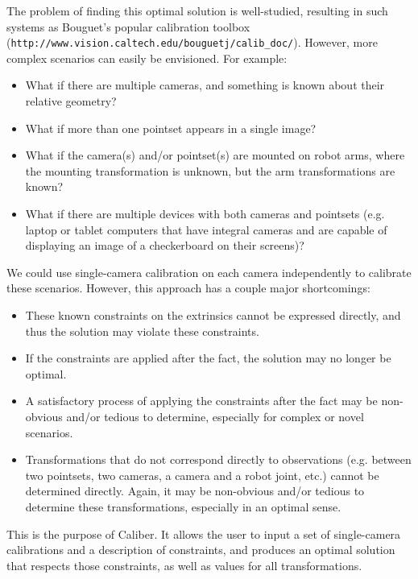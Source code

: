 The problem of finding this optimal solution is well-studied, resulting in such systems as 
Bouguet's popular calibration toolbox \\
(\texttt{http://www.vision.caltech.edu/bouguetj/calib\_doc/}).
However, more complex scenarios can easily be envisioned. For example:

\begin{itemize}
	\item What if there are multiple cameras, and something is known about their relative geometry?
	\item What if more than one pointset appears in a single image?
	\item What if the camera(s) and/or pointset(s) are mounted on robot arms, where the mounting 
		transformation is unknown, but the arm transformations are known?
	\item What if there are multiple devices with both cameras and pointsets 
		(e.g. laptop or tablet computers that have integral cameras and are capable of displaying
		an image of a checkerboard on their screens)?
\end{itemize}

We could use single-camera calibration on each camera independently to calibrate these scenarios. 
However, this approach has a couple major shortcomings:
\begin{itemize}
	\item These known constraints on the extrinsics cannot be expressed directly, 
		and thus the solution may violate these constraints. 
	\item If the constraints are applied after the fact, the solution may 
		no longer be optimal.
	\item A satisfactory process of applying the constraints after the fact may be non-obvious 
		and/or tedious to determine, especially for complex or novel scenarios.
	\item Transformations that do not correspond directly to observations (e.g. between
		two pointsets, two cameras, a camera and a robot joint, etc.) cannot be determined directly.
		Again, it may be non-obvious and/or tedious to determine these transformations,
		especially in an optimal sense.
\end{itemize}

This is the purpose of Caliber. It allows the user to input a set of single-camera calibrations 
and a description of constraints, and produces an optimal solution that respects those constraints,
as well as values for all transformations.

